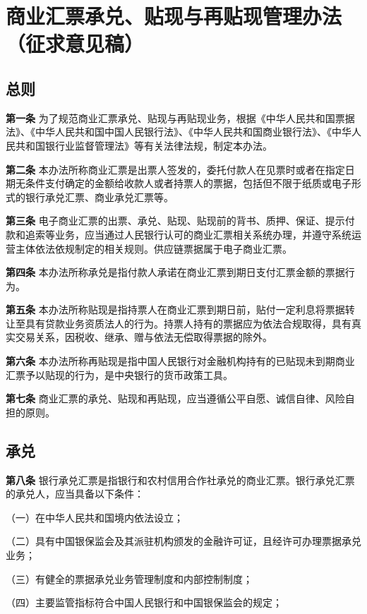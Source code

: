 \chapter{商业汇票承兑、贴现与再贴现管理办法（征求意见稿）}

\section{总则}

{\bf 第一条} 为了规范商业汇票承兑、贴现与再贴现业务，根据《中华人民共和国票据法》、《中华人民共和国中国人民银行法》、《中华人民共和国商业银行法》、《中华人民共和国银行业监督管理法》等有关法律法规，制定本办法。

{\bf 第二条} 本办法所称商业汇票是出票人签发的，委托付款人在见票时或者在指定日期无条件支付确定的金额给收款人或者持票人的票据，包括但不限于纸质或电子形式的银行承兑汇票、商业承兑汇票等。

{\bf 第三条} 电子商业汇票的出票、承兑、贴现、贴现前的背书、质押、保证、提示付款和追索等业务，应当通过人民银行认可的商业汇票相关系统办理，并遵守系统运营主体依法依规制定的相关规则。供应链票据属于电子商业汇票。

{\bf 第四条} 本办法所称承兑是指付款人承诺在商业汇票到期日支付汇票金额的票据行为。

{\bf 第五条} 本办法所称贴现是指持票人在商业汇票到期日前，贴付一定利息将票据转让至具有贷款业务资质法人的行为。持票人持有的票据应为依法合规取得，具有真实交易关系，因税收、继承、赠与依法无偿取得票据的除外。

{\bf 第六条} 本办法所称再贴现是指中国人民银行对金融机构持有的已贴现未到期商业汇票予以贴现的行为，是中央银行的货币政策工具。

{\bf 第七条} 商业汇票的承兑、贴现和再贴现，应当遵循公平自愿、诚信自律、风险自担的原则。

\section{承兑}

{\bf 第八条} 银行承兑汇票是指银行和农村信用合作社承兑的商业汇票。银行承兑汇票的承兑人，应当具备以下条件：

（一）在中华人民共和国境内依法设立；

（二）具有中国银保监会及其派驻机构颁发的金融许可证，且经许可办理票据承兑业务；

（三）有健全的票据承兑业务管理制度和内部控制制度；

（四）主要监管指标符合中国人民银行和中国银保监会的规定；

